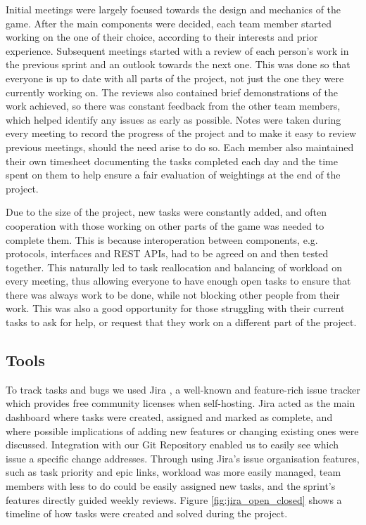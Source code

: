 \documentclass[a4paper,11pt]{article}
\begin{document}
Initial meetings were largely focused towards the design and mechanics of the game. After the main components were decided, each team member started working on the one of their choice, according to their interests and prior experience. Subsequent meetings started with a review of each person’s work in the previous sprint and an outlook towards the next one. This was done so that everyone is up to date with all parts of the project, not just the one they were currently working on. The reviews also contained brief demonstrations of the work achieved, so there was constant feedback from the other team members, which helped identify any issues as early as possible. Notes were taken during every meeting to record the progress of the project and to make it easy to review previous meetings, should the need arise to do so. Each member also maintained their own timesheet documenting the tasks completed each day and the time spent on them to help ensure a fair evaluation of weightings at the end of the project.

Due to the size of the project, new tasks were constantly added, and often cooperation with those working on other parts of the game was needed to complete them. This is because interoperation between components, e.g. protocols, interfaces and REST APIs, had to be agreed on and then tested together. This naturally led to task reallocation and balancing of workload on every meeting, thus allowing everyone to have enough open tasks to ensure that there was always work to be done, while not blocking other people from their work. This was also a good opportunity for those struggling with their current tasks to ask for help, or request that they work on a different part of the project.

\subsection{Tools}

To track tasks and bugs we used Jira \cite{jira}, a well-known and feature-rich issue tracker which provides free community licenses when self-hosting. Jira acted as the main dashboard where tasks were created, assigned and marked as complete, and where possible implications of adding new features or changing existing ones were discussed. Integration with our Git Repository enabled us to easily see which issue a specific change addresses.  Through using Jira’s issue organisation features, such as task priority and epic links, workload was more easily managed, team members with less to do could be easily assigned new tasks, and the sprint’s features directly guided weekly reviews. Figure \ref{fig:jira_open_closed} shows a timeline of how tasks were created and solved during the project.
\end{document}
